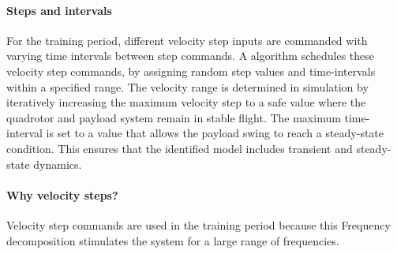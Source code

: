         \paragraph{Steps and intervals}
        For the training period, different velocity step inputs are commanded with varying time intervals between step commands.
        A algorithm schedules these velocity step commands, by assigning random step values and time-intervals within a specified range.
        The velocity range is determined in simulation by iteratively increasing the maximum velocity step 
        to a safe value where the quadrotor and payload system remain in stable flight.
        The maximum time-interval is set to a value that allows the payload swing to reach a steady-state condition.
        This ensures that the identified model includes transient and steady-state dynamics.

        \paragraph{Why velocity steps?}
        Velocity step commands are used in the training period because this 
        Frequency decomposition stimulates the system for a large range of frequencies.
        
